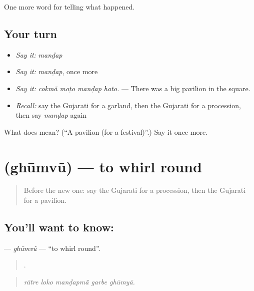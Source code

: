 \begin{grammarlens}[title={What you've built}]
One more word for telling what happened.
\end{grammarlens}

\subsection*{Your turn}
\begin{itemize}
\raggedright
  \item \emph{Say it:} \emph{manḍap}
  \item \emph{Say it:} \emph{manḍap}, once more
  \item \emph{Say it:} \emph{cokmā̃ moṭo manḍap hato.} — There was a big pavilion in the square.
  \item \emph{Recall:} say the Gujarati for a garland, then the Gujarati for a procession, then say \emph{manḍap} again
\end{itemize}

\begin{tcolorbox}[breakable,colback=teal!4,colframe=teal!35!black,title={Before you move on}]
What does  mean? (\textquotedblleft{}A pavilion (for a festival)\textquotedblright{}.) Say it once more.
\end{tcolorbox}
\section[\texorpdfstring{\gu{ઘૂમવું} (ghūmvũ)}{ઘૂમવું (ghūmvũ)}]{ (ghūmvũ) — to whirl round}

\label{lesson:GU-C330-ghumvu}



\begin{quote}
Before the new one: say the Gujarati for a procession, then the Gujarati for a pavilion.
\end{quote}

\subsection*{You'll want to know: }
\textbf{} — \emph{ghūmvũ} — \textquotedblleft{}to whirl round\textquotedblright{}.

\begin{quote}
    .
\end{quote}

\begin{quote}
\emph{rātre loko manḍapmā̃ garbe ghūmyā.}
\end{quote}

